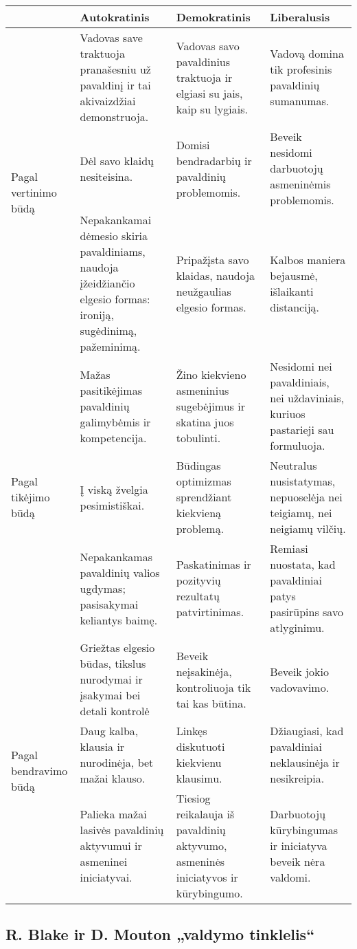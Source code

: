 \begin{tabularx}{\textwidth}[]{l | X | X | X}
  & Autokratinis & Demokratinis & Liberalusis \\
  \hline
  \multirow{3}{0.1\textwidth}{Pagal vertinimo būdą}
  & Vadovas save traktuoja pranašesniu už pavaldinį ir tai akivaizdžiai 
    demonstruoja.
  & Vadovas savo pavaldinius traktuoja ir elgiasi su jais, kaip su
    lygiais.
  & Vadovą domina tik profesinis pavaldinių sumanumas. \\
  & Dėl savo klaidų nesiteisina.
  & Domisi bendradarbių ir pavaldinių problemomis.
  & Beveik nesidomi darbuotojų asmeninėmis problemomis. \\
  & Nepakankamai dėmesio skiria pavaldiniams, naudoja įžeidžiančio elgesio 
    formas: ironiją, sugėdinimą, pažeminimą.
  & Pripažįsta savo klaidas, naudoja neužgaulias elgesio formas.
  & Kalbos maniera bejausmė, išlaikanti distanciją. \\
  \hline
  \multirow{3}{0.1\textwidth}{Pagal tikėjimo būdą}
  & Mažas pasitikėjimas pavaldinių galimybėmis ir kompetencija.
  & Žino kiekvieno asmeninius sugebėjimus ir skatina juos tobulinti.
  & Nesidomi nei pavaldiniais, nei uždaviniais, kuriuos pastarieji sau
    formuluoja. \\
  & Į viską žvelgia pesimistiškai.
  & Būdingas optimizmas sprendžiant kiekvieną problemą.
  & Neutralus nusistatymas, nepuoselėja nei teigiamų, nei neigiamų
    vilčių. \\
  & Nepakankamas pavaldinių valios ugdymas; pasisakymai keliantys baimę.
  & Paskatinimas ir pozityvių rezultatų patvirtinimas.
  & Remiasi nuostata, kad pavaldiniai patys pasirūpins savo atlyginimu. \\
  \hline
  \multirow{3}{0.1\textwidth}{Pagal bendravimo būdą}
  & Griežtas elgesio būdas, tikslus nurodymai ir įsakymai bei detali
    kontrolė
  & Beveik neįsakinėja, kontroliuoja tik tai kas būtina.
  & Beveik jokio vadovavimo. \\
  & Daug kalba, klausia ir nurodinėja, bet mažai klauso.
  & Linkęs diskutuoti kiekvienu klausimu.
  & Džiaugiasi, kad pavaldiniai neklausinėja ir nesikreipia. \\
  & Palieka mažai lasivės pavaldinių aktyvumui ir asmeninei iniciatyvai.
  & Tiesiog reikalauja  iš pavaldinių aktyvumo, asmeninės iniciatyvos ir
    kūrybingumo.
  & Darbuotojų kūrybingumas ir iniciatyva beveik nėra valdomi. \\
\end{tabularx}

\subsection{R. Blake ir D. Mouton „valdymo tinklelis“}

